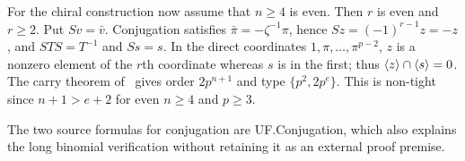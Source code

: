 For the chiral construction now assume that $n\geq4$ is even.
Then $r$ is even and $r\geq2$. Put $Sv=\bar v$.
Conjugation satisfies $\bar\pi=-\zeta^{-1}\pi$, hence
$Sz=(-1)^{r-1}z=-z$, and $STS=T^{-1}$ and $Ss=s$.
In the direct coordinates $1,\pi,\ldots,\pi^{p-2}$,
$z$ is a nonzero element of the $r$th coordinate whereas $s$ is
in the first; thus $\langle z\rangle\cap\langle s\rangle=0$.
The carry theorem of~\cite{UF} gives order $2p^{n+1}$ and type
$\{p^2,2p^e\}$. This is non-tight since $n+1>e+2$ for even
$n\geq4$ and $p\geq3$.

The two source formulas for
conjugation are UF.Conjugation, which also explains the long
binomial verification without retaining it as an external proof premise.

